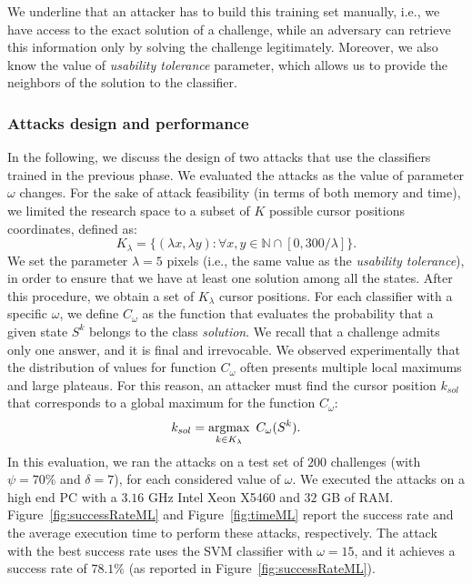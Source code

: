 \documentclass[conference]{IEEEtran}
\begin{document}
We underline that an attacker has to build this training set manually, i.e., we have access to the exact solution of a challenge, while an adversary can retrieve this information only by solving the challenge legitimately.
Moreover, we also know the value of \textit{usability tolerance} parameter, which allows us to provide the neighbors of the solution to the classifier.


\subsubsection{Attacks design and performance}
\label{attackandperformance}
In the following, we discuss the design of two attacks that use the classifiers trained in the previous phase.
We evaluated the attacks as the value of parameter $\omega$ changes.
For the sake of attack feasibility (in terms of both memory and time), we limited the research space to a subset of $K$ possible cursor positions coordinates, defined as: $$K_{\lambda}=\{ (\lambda x, \lambda y) : \forall x,y \in \mathbb{N} \cap [0,{300}/{\lambda}]\}.$$
We set the parameter $\lambda=5$ pixels (i.e., the same value as the \textit{usability tolerance}), in order to ensure that we have at least one solution among all the states.
After this procedure, we obtain a set of $K_{\lambda}$ cursor positions. For each classifier with a specific $\omega$, we define $C_\omega$ as the function that evaluates the probability that a given state $S^k$ belongs to the class \textit{solution}. 
We recall that a challenge admits only one answer, and it is final and irrevocable.
We observed experimentally that the distribution of values for function $C_\omega$ 
often presents multiple local maximums and large plateaus. For this reason, an attacker must find the cursor position $k_{sol}$ that corresponds to a global maximum for the function $C_\omega$: $$ k_{sol}=\argmax_{k \in K_{\lambda}} \ C_\omega(S^k). $$
In this evaluation, we ran the attacks on a test set of $200$ challenges (with $\psi=70\%$ and $\delta=7$), for each considered value of $\omega$. 
We executed the attacks on a high end PC with a $3.16$ GHz Intel Xeon X5460 and $32$ GB of RAM.
Figure~\ref{fig:successRateML} and Figure~\ref{fig:timeML} report the success rate and the average execution time to perform these attacks, respectively.
The attack with the best success rate uses the SVM classifier with $\omega=15$, and it achieves a success rate of $78.1\%$ (as reported in Figure~\ref{fig:successRateML}).
\end{document}

